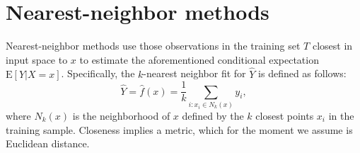 \documentclass{report}
\theoremstyle{nonumberplain}
\begin{document}
\section{Nearest-neighbor methods}
Nearest-neighbor methods use those observations in the training set $T$ closest in input space to $x$ to estimate the aforementioned conditional expectation  $\mathrm{E}[Y|X=x]$. Specifically, the $k$-nearest neighbor fit for $\hat{Y}$ is defined as follows:
\[
\hat{Y}=\hat{f}(x)=\dfrac{1}{k}\sum_{i:x_i\in N_k(x)}y_i,
\]
where $N_k(x)$ is the neighborhood of $x$ defined by the $k$ closest points $x_i$ in the training sample. Closeness implies a metric, which for the moment we assume is Euclidean distance.
\end{document}
